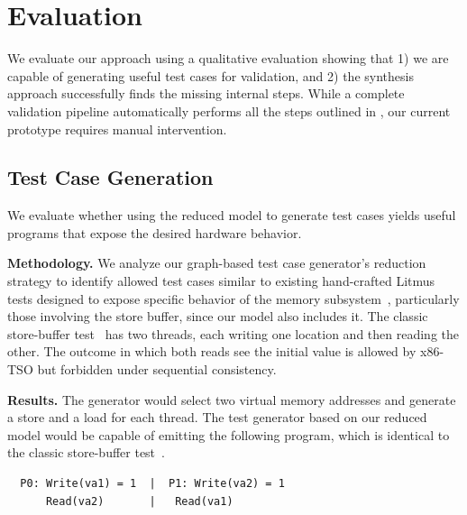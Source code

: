 \section{Evaluation}\label{sec:eval}


We evaluate our approach using a qualitative evaluation showing that  1) we are capable of generating useful test cases for validation, and 2) the synthesis approach successfully finds the missing internal steps.
While a complete validation pipeline automatically performs all the steps outlined in , our current prototype requires manual intervention.

\subsection{Test Case Generation}

We evaluate whether using the reduced model to generate test cases yields useful programs that expose the desired hardware behavior.

\noindent\textbf{Methodology.}
%
We analyze our graph-based test case generator's reduction strategy to identify allowed test cases similar to existing hand-crafted Litmus tests designed to expose specific behavior of the memory subsystem~\cite{owens2009x86tso, sewell2010x86tso,alglave2011litmus,alglave2014herding}, particularly those involving the store buffer, since our model also includes it.
The classic store-buffer test~\cite{diySBlitmus} has two threads, each writing one location and then reading the other.
The outcome in which both reads see the initial value is allowed by x86-TSO but forbidden under sequential consistency. 

\noindent\textbf{Results.}
The generator would select two virtual memory addresses and generate a store and a load for each thread.
The test generator based on our reduced model would be capable of emitting the following program, which is identical to the classic store-buffer test~\cite{diySBlitmus}. 
%
\begin{verbatim}
  P0: Write(va1) = 1  |  P1: Write(va2) = 1
      Read(va2)       |   Read(va1)  
\end{verbatim}


